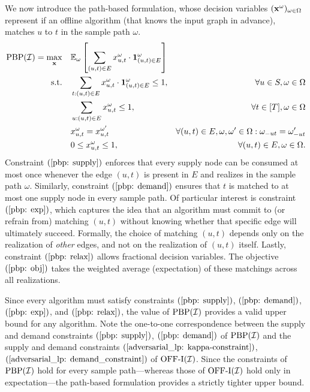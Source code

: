{ We now introduce the path-based formulation, whose decision variables  $(\mathbf{x}^\omega)_{\omega \in \Omega}$ represent if an offline algorithm (that knows the input graph in advance), matches $u$ to $t$ in the sample path $\omega$.
\begin{align}
\mathrm{PBP}(\mathcal I) = \max_{\mathbf{x}} \quad &  \mathbb E_{\omega} \left[ \sum_{(u,t) \in E} x_{u,t}^\omega  \cdot \bm{1}^\omega_{(u,t) \in E} \right] \label{pbp: obj}\\
\text{s.t.} \quad & \sum_{t: (u,t) \in E} x_{u,t}^\omega  \cdot \bm{1}^\omega_{(u,t) \in E} \leq 1, & \forall u \in S, \omega \in \Omega \label{pbp: supply}\\
& \sum_{u: (u,t) \in E} x_{u,t}^\omega  \leq 1, & \forall t \in [T], \omega \in \Omega \label{pbp: demand}\\
& x^\omega_{u,t} = x^{\omega'}_{u,t} &\forall (u,t) \in E, \omega, \omega' \in \Omega: \omega_{-ut} = \omega'_{-ut} \label{pbp: exp}\\
& 0 \leq x^\omega_{u,t} \leq 1, & \forall (u,t) \in E, \omega \in \Omega. \label{pbp: relax}
\end{align}
\noindent
Constraint $ (\ref{pbp: supply}) $ enforces that every supply node can be consumed at most once whenever the edge $ (u,t) $ is present in $ E $ and realizes in the sample path $ \omega $.
Similarly, constraint $ (\ref{pbp: demand}) $ ensures that $ t $ is matched to at most one supply node in every sample path.
Of particular interest is constraint $ (\ref{pbp: exp}) $, which captures the idea that an algorithm must commit to (or refrain from) matching $ (u,t) $ without knowing whether that specific edge will ultimately succeed.
Formally, the choice of matching $ (u,t) $ depends only on the realization of \emph{other} edges, and not on the realization of $ (u,t) $ itself.
Lastly, constraint $ (\ref{pbp: relax}) $ allows fractional decision variables. The objective $ (\ref{pbp: obj}) $ takes the weighted average (expectation) of these matchings across all realizations.


Since every algorithm must satisfy constraints $ (\ref{pbp: supply}) $, $ (\ref{pbp: demand}) $, $ (\ref{pbp: exp}) $, and $ (\ref{pbp: relax}) $, the value of $ \mathrm{PBP}(\mathcal I) $ provides a valid upper bound for any algorithm.
Note the one-to-one correspondence between the supply and demand constraints $ (\ref{pbp: supply}) $, $ (\ref{pbp: demand}) $ of $ \mathrm{PBP}(\mathcal I) $ and the supply and demand constraints $ (\ref{adversarial_lp: kappa-constraint}) $, $ (\ref{adversarial_lp: demand_constraint}) $ of $ \mathrm{\mathrm{OFF}}\textrm{-}\mathrm{I}(\mathcal I) $.
Since the constraints of $ \mathrm{PBP}(\mathcal I) $ hold for every sample path---whereas those of $ \mathrm{\mathrm{OFF}}\textrm{-}\mathrm{I}(\mathcal I) $ hold only in expectation---the path-based formulation provides a strictly tighter upper bound.

}
